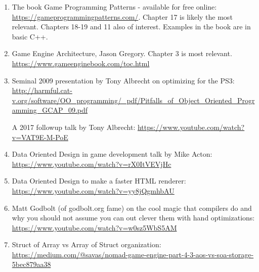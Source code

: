 \documentclass[12pt,letterpaper]{article}
\begin{document}
	\begin{enumerate}

		\item The book Game Programming Patterns - available for free online: \url{https://gameprogrammingpatterns.com/}. Chapter 17 is likely the most relevant. Chapters 18-19 and 11 also of interest. Examples in the book are in basic C++.
	
		\item Game Engine Architecture, Jason Gregory. Chapter 3 is most relevant. \url{https://www.gameenginebook.com/toc.html}

		\item Seminal 2009 presentation by Tony Albrecht on optimizing for the PS3: 
		\url{http://harmful.cat-v.org/software/OO_programming/_pdf/Pitfalls_of_Object_Oriented_Programming_GCAP_09.pdf}

		A 2017 followup talk by Tony Albrecht:
		\url{https://www.youtube.com/watch?v=VAT9E-M-PoE}


		\item Data Oriented Design in game development talk by Mike Acton: \url{https://www.youtube.com/watch?v=rX0ItVEVjHc}

		\item Data Oriented Design to make a faster HTML renderer: \url{https://www.youtube.com/watch?v=yy8jQgmhbAU}

		\item Matt Godbolt (of godbolt.org fame) on the cool magic that compilers do and why you should not assume you can out clever them with hand optimizations:
		\url{https://www.youtube.com/watch?v=w0sz5WbS5AM}

		\item Struct of Array vs Array of Struct organization: \href{https://medium.com/@savas/nomad-game-engine-part-4-3-aos-vs-soa-storage-5bec879aa38}{https://medium.com/@savas/nomad-game-engine-part-4-3-aos-vs-soa-storage-5bec879aa38}

	\end{enumerate}
\end{document}
